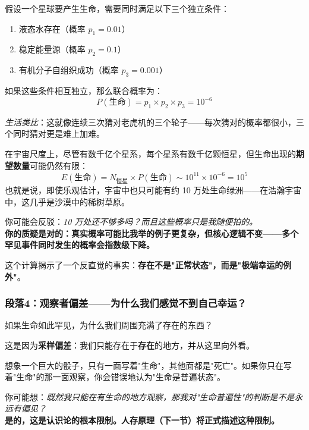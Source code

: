 \documentclass[../main.tex]{subfiles}
\begin{document}
	假设一个星球要产生生命，需要同时满足以下三个独立条件：
	\begin{enumerate}
		\item 液态水存在（概率 $p_1 = 0.01$）
		\item 稳定能量源（概率 $p_2 = 0.1$）
		\item 有机分子自组织成功（概率 $p_3 = 0.001$）
	\end{enumerate}

	如果这些条件相互独立，那么联合概率为：
	\[ P(生命) = p_1 \times p_2 \times p_3 = 10^{-6} \]
	
	\textit{生活类比}：这就像连续三次猜对老虎机的三个轮子——每次猜对的概率都很小，三个同时猜对更是难上加难。

	在宇宙尺度上，尽管有数千亿个星系，每个星系有数千亿颗恒星，但生命出现的\textbf{期望数量}可能仍然有限：
	\[ E(生命) = N_{恒星} \times P(生命) \sim 10^{11} \times 10^{-6} = 10^5 \]
	也就是说，即使乐观估计，宇宙中也只可能有约 10 万处生命绿洲——在浩瀚宇宙中，这几乎是沙漠中的稀树草原。

	\begin{tcolorbox}[colback=yellow!5, title=\textit{读者行为预测}]
		你可能会反驳：\textit{10 万处还不够多吗？而且这些概率只是我随便拍的。}\\
		\textbf{你的质疑是对的：真实概率可能比我举的例子更复杂，但核心逻辑不变——多个罕见事件同时发生的概率会指数级下降。}
	\end{tcolorbox}

	这个计算揭示了一个反直觉的事实：\textbf{存在不是"正常状态"，而是"极端幸运的例外"}。

	\subsubsection*{段落4：观察者偏差——为什么我们感觉不到自己幸运？}
	如果生命如此罕见，为什么我们周围充满了存在的东西？

	这是因为\textbf{采样偏差}：我们只能存在于\textbf{存在}的地方，并从这里向外看。

	想象一个巨大的骰子，只有一面写着"生命"，其他面都是"死亡"。如果你只在写着"生命"的那一面观察，你会错误地认为"生命是普遍状态"。

	\begin{tcolorbox}[colback=yellow!5, title=\textit{读者行为预测}]
		你可能想：\textit{既然我只能在有生命的地方观察，那我对"生命普遍性"的判断是不是永远有偏见？}\\
		\textbf{是的，这是认识论的根本限制。人存原理（下一节）将正式描述这种限制。}
	\end{tcolorbox}
\end{document}
